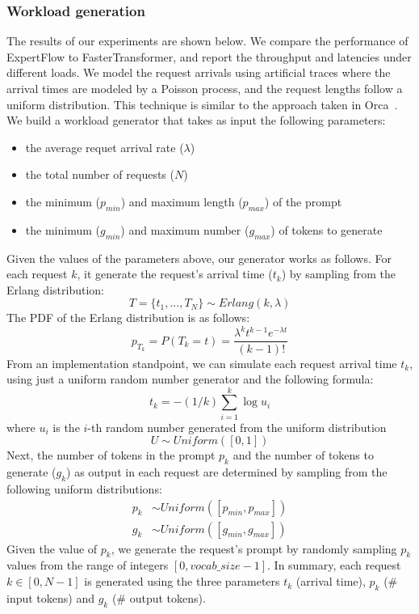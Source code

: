 \subsubsection{Workload generation}
The results of our experiments are shown below. We compare the performance of ExpertFlow to FasterTransformer, and report the throughput and latencies under different loads. We model the request arrivals using artificial traces where the arrival times are modeled by a Poisson process, and the request lengths follow a uniform distribution. This technique is similar to the approach taken in Orca~\cite{orca}. We build a workload generator that takes as input the following parameters:
\begin{itemize}
    \item the average requet arrival rate ($\lambda$)
    \item the total number of requests ($N$)
    \item the minimum ($p_{min}$) and maximum length ($p_{max}$) of the prompt
    \item the minimum ($g_{min}$) and maximum number ($g_{max}$) of tokens to generate
\end{itemize}
Given the values of the parameters above, our generator works as follows. For each request $k$, it generate the request's arrival time ($t_k$) by sampling from the Erlang distribution:
\begin{equation}
    T=\{t_1,..., T_N\} \sim Erlang(k, \lambda)
\end{equation}
The PDF of the Erlang distribution is as follows: 
\begin{equation}
    p_{T_k} = P(T_k=t)=\frac{\lambda^kt^{k-1}e^{-\lambda t}}{(k-1)!}
\end{equation}
From an implementation standpoint, we can simulate each request arrival time $t_k$, using just a uniform random number generator and the following formula: 
\begin{equation}
    t_k=-(1/k)\sum_{i=1}^k\log{u_i}
\end{equation}
where $u_i$ is the $i$-th random number generated from the uniform distribution 
\begin{equation}
    U \sim Uniform([0,1])
\end{equation}
Next, the number of tokens in the prompt $p_k$ and the number of tokens to generate ($g_k$) as output in each request are determined by sampling from the following uniform distributions:
\begin{align}
    p_k & \sim Uniform([p_{min}, p_{max}]) \\
    g_k & \sim Uniform([g_{min}, g_{max}])
\end{align}
Given the value of $p_k$, we generate the request's prompt by randomly sampling $p_k$ values from the range of integers $[0, vocab\_size -1]$.
In summary, each request $k \in [0, N-1]$ is generated using the three parameters $t_k$ (arrival time), $p_k$ (\# input tokens) and $g_k$ (\# output tokens). 
